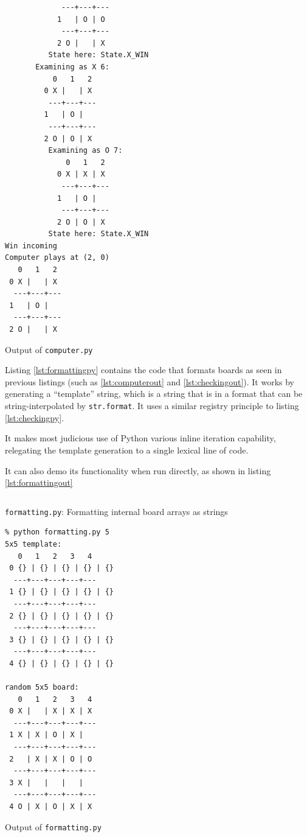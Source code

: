 \documentclass[fleqn,a4paper,11pt]{article}
\begin{document}
\begin{longlisting}
\begin{verbatim}
             ---+---+---
            1   | O | O 
             ---+---+---
            2 O |   | X 
          State here: State.X_WIN
       Examining as X 6:
           0   1   2
         0 X |   | X 
          ---+---+---
         1   | O |   
          ---+---+---
         2 O | O | X 
          Examining as O 7:
              0   1   2
            0 X | X | X 
             ---+---+---
            1   | O |   
             ---+---+---
            2 O | O | X 
          State here: State.X_WIN
Win incoming
Computer plays at (2, 0)
   0   1   2
 0 X |   | X 
  ---+---+---
 1   | O |   
  ---+---+---
 2 O |   | X 
\end{verbatim}
\caption{Output of \texttt{computer.py}}\label{lst:computerout}
\end{longlisting}

    Listing \ref{lst:formattingpy} contains the code that formats boards as seen
    in previous listings (such as \ref{lst:computerout} and
    \ref{lst:checkingout}). It works by generating a ``template'' string, which
    is a string that is in a format that can be string-interpolated by
    \texttt{str.format}. It uses a similar registry principle to listing
    \ref{lst:checkingpy}.

    It makes most judicious use of Python various inline iteration capability,
    relegating the template generation to a single lexical line of code.

    It can also demo its functionality when run directly, as shown in listing
    \ref{lst:formattingout}

\begin{longlisting}
\inputminted{python}{../src/formatting.py}
\caption{\texttt{formatting.py}: Formatting internal board arrays as strings}
\label{lst:formattingpy}
\end{longlisting}

\begin{longlisting}
\begin{verbatim}
% python formatting.py 5
5x5 template:
   0   1   2   3   4
 0 {} | {} | {} | {} | {}
  ---+---+---+---+---
 1 {} | {} | {} | {} | {}
  ---+---+---+---+---
 2 {} | {} | {} | {} | {}
  ---+---+---+---+---
 3 {} | {} | {} | {} | {}
  ---+---+---+---+---
 4 {} | {} | {} | {} | {}

random 5x5 board:
   0   1   2   3   4
 0 X |   | X | X | X
  ---+---+---+---+---
 1 X | X | O | X |
  ---+---+---+---+---
 2   | X | X | O | O
  ---+---+---+---+---
 3 X |   |   |   |
  ---+---+---+---+---
 4 O | X | O | X | X
\end{verbatim}
\caption{Output of \texttt{formatting.py}}\label{lst:formattingout}
\end{longlisting}
\end{document}
